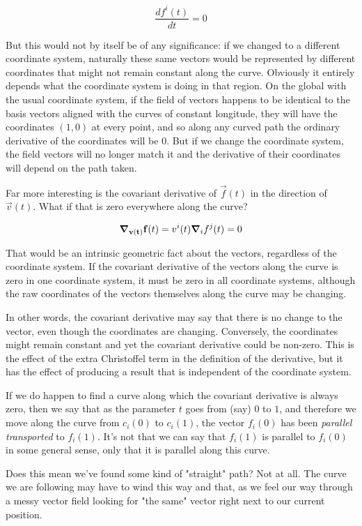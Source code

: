 $$
\frac{d f^i(t)}{dt} = 0
$$

But this would not by itself be of any significance: if we changed to a different coordinate system, naturally these same vectors would be represented by different coordinates that might not remain constant along the curve. Obviously it entirely depends what the coordinate system is doing in that region. On the global with the usual coordinate system, if the field of vectors happens to be identical to the basis vectors aligned with the curves of constant longitude, they will have the coordinates $(1, 0)$ at every point, and so along any curved path the ordinary derivative of the coordinates will be $0$. But if we change the coordinate system, the field vectors will no longer match it and the derivative of their coordinates will depend on the path taken.

Far more interesting is the covariant derivative of $\vec{f}(t)$ in the direction of $\vec{v}(t)$. What if that is zero everywhere along the curve?

$$
\grad_{\mathbf{v(t)}} \mathbf{f}(t)
=
v^i(t) \grad_i f^j(t) = 0
$$

That would be an intrinsic geometric fact about the vectors, regardless of the coordinate system. If the covariant derivative of the vectors along the curve is zero in one coordinate system, it must be zero in all coordinate systems, although the raw coordinates of the vectors themselves along the curve may be changing.

In other words, the covariant derivative may say that there is no change to the vector, even though the coordinates are changing. Conversely, the coordinates might remain constant and yet the covariant derivative could be non-zero. This is the effect of the extra Christoffel term in the definition of the derivative, but it has the effect of producing a result that is independent of the coordinate system.

If we do happen to find a curve along which the covariant derivative is always zero, then we say that as the parameter $t$ goes from (say) $0$ to $1$, and therefore we move along the curve from $c_i(0)$ to $c_i(1)$, the vector $f_i(0)$ has been \textit{parallel transported} to $f_i(1)$. It's not that we can say that $f_i(1)$ is parallel to $f_i(0)$ in some general sense, only that it is parallel along this curve.

Does this mean we've found some kind of "straight" path? Not at all. The curve we are following may have to wind this way and that, as we feel our way through a messy vector field looking for "the same" vector right next to our current position.

